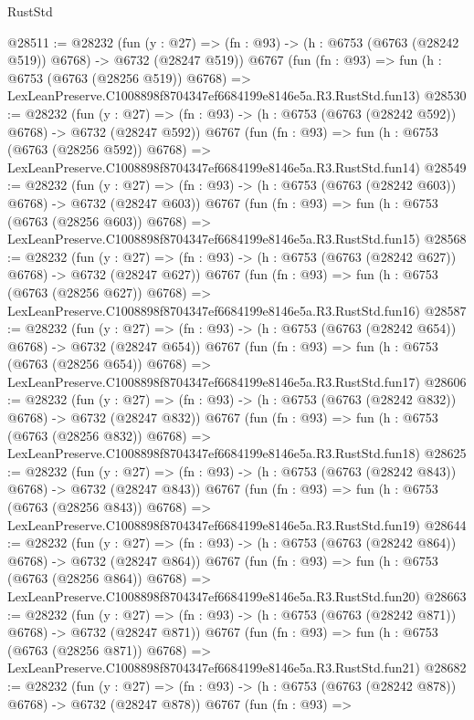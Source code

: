 \begin{lexlean}{RustStd}
\begin{coremodule}
@28511 := @28232
    (fun (y : @27) => (fn : @93) -> (h : @6753 (@6763 (@28242 @519)) @6768) -> @6732 (@28247 @519))
    @6767
    (fun (fn : @93) =>
    fun (h : @6753 (@6763 (@28256 @519)) @6768) =>
    LexLeanPreserve.C1008898f8704347ef6684199e8146e5a.R3.RustStd.fun13)
@28530 := @28232
    (fun (y : @27) => (fn : @93) -> (h : @6753 (@6763 (@28242 @592)) @6768) -> @6732 (@28247 @592))
    @6767
    (fun (fn : @93) =>
    fun (h : @6753 (@6763 (@28256 @592)) @6768) =>
    LexLeanPreserve.C1008898f8704347ef6684199e8146e5a.R3.RustStd.fun14)
@28549 := @28232
    (fun (y : @27) => (fn : @93) -> (h : @6753 (@6763 (@28242 @603)) @6768) -> @6732 (@28247 @603))
    @6767
    (fun (fn : @93) =>
    fun (h : @6753 (@6763 (@28256 @603)) @6768) =>
    LexLeanPreserve.C1008898f8704347ef6684199e8146e5a.R3.RustStd.fun15)
@28568 := @28232
    (fun (y : @27) => (fn : @93) -> (h : @6753 (@6763 (@28242 @627)) @6768) -> @6732 (@28247 @627))
    @6767
    (fun (fn : @93) =>
    fun (h : @6753 (@6763 (@28256 @627)) @6768) =>
    LexLeanPreserve.C1008898f8704347ef6684199e8146e5a.R3.RustStd.fun16)
@28587 := @28232
    (fun (y : @27) => (fn : @93) -> (h : @6753 (@6763 (@28242 @654)) @6768) -> @6732 (@28247 @654))
    @6767
    (fun (fn : @93) =>
    fun (h : @6753 (@6763 (@28256 @654)) @6768) =>
    LexLeanPreserve.C1008898f8704347ef6684199e8146e5a.R3.RustStd.fun17)
@28606 := @28232
    (fun (y : @27) => (fn : @93) -> (h : @6753 (@6763 (@28242 @832)) @6768) -> @6732 (@28247 @832))
    @6767
    (fun (fn : @93) =>
    fun (h : @6753 (@6763 (@28256 @832)) @6768) =>
    LexLeanPreserve.C1008898f8704347ef6684199e8146e5a.R3.RustStd.fun18)
@28625 := @28232
    (fun (y : @27) => (fn : @93) -> (h : @6753 (@6763 (@28242 @843)) @6768) -> @6732 (@28247 @843))
    @6767
    (fun (fn : @93) =>
    fun (h : @6753 (@6763 (@28256 @843)) @6768) =>
    LexLeanPreserve.C1008898f8704347ef6684199e8146e5a.R3.RustStd.fun19)
@28644 := @28232
    (fun (y : @27) => (fn : @93) -> (h : @6753 (@6763 (@28242 @864)) @6768) -> @6732 (@28247 @864))
    @6767
    (fun (fn : @93) =>
    fun (h : @6753 (@6763 (@28256 @864)) @6768) =>
    LexLeanPreserve.C1008898f8704347ef6684199e8146e5a.R3.RustStd.fun20)
@28663 := @28232
    (fun (y : @27) => (fn : @93) -> (h : @6753 (@6763 (@28242 @871)) @6768) -> @6732 (@28247 @871))
    @6767
    (fun (fn : @93) =>
    fun (h : @6753 (@6763 (@28256 @871)) @6768) =>
    LexLeanPreserve.C1008898f8704347ef6684199e8146e5a.R3.RustStd.fun21)
@28682 := @28232
    (fun (y : @27) => (fn : @93) -> (h : @6753 (@6763 (@28242 @878)) @6768) -> @6732 (@28247 @878))
    @6767
    (fun (fn : @93) =>

\end{coremodule}
\end{lexlean}
